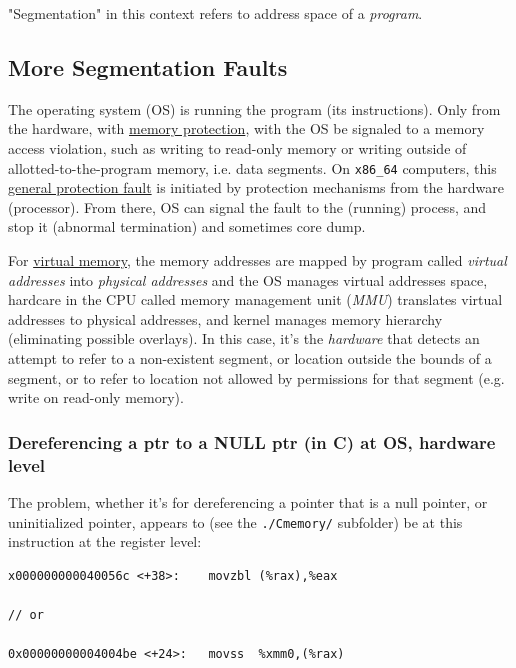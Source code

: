 \documentclass[10pt]{amsart}
\begin{document}
"Segmentation" in this context refers to address space of a \emph{program}.


\subsection{More Segmentation Faults}  

The operating system (OS) is running the program (its instructions).  Only from the hardware, with \href{https://en.wikipedia.org/wiki/Memory_protection}{memory protection}, with the OS be signaled to a memory access violation, such as writing to read-only memory or writing outside of allotted-to-the-program memory, i.e. data segments.  On \verb|x86_64| computers, this \href{https://en.wikipedia.org/wiki/General_protection_fault}{general protection fault} is initiated by protection mechanisms from the hardware (processor).  From there, OS can signal the fault to the (running) process, and stop it (abnormal termination) and sometimes core dump. 

For \href{https://en.wikipedia.org/wiki/Virtual_memory}{virtual memory}, the memory addresses are mapped by program called \emph{virtual addresses} into \emph{physical addresses} and the OS manages virtual addresses space, hardcare in the CPU called memory management unit (\emph{MMU}) translates virtual addresses to physical addresses, and kernel manages memory hierarchy (eliminating possible overlays).  In this case, it's the \emph{hardware} that detects an attempt to refer to a non-existent segment, or location outside the bounds of a segment, or to refer to location not allowed by permissions for that segment (e.g. write on read-only memory).   

\subsubsection{Dereferencing a ptr to a NULL ptr (in C) at OS, hardware level}


The problem, whether it's for dereferencing a pointer that is a null pointer, or uninitialized pointer, appears to (see the \verb|./Cmemory/| subfolder) be at this instruction at the register level:  

\begin{lstlisting}
x000000000040056c <+38>:	movzbl (%rax),%eax

// or 

0x00000000004004be <+24>:	movss  %xmm0,(%rax)  
\end{lstlisting}
\end{document}
